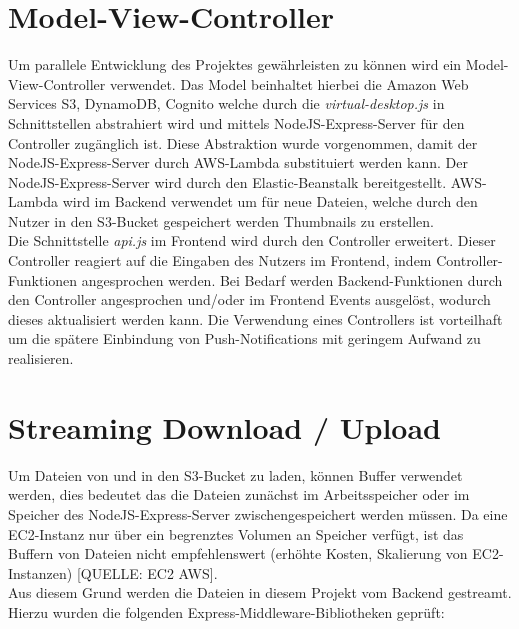 \documentclass[a4paper, 12pt]{scrreprt}
\begin{document}
\section{Model-View-Controller}

Um parallele Entwicklung des Projektes gewährleisten zu können wird ein Model-View-Controller verwendet. Das Model beinhaltet hierbei die Amazon Web Services S3, DynamoDB, Cognito welche durch die \textit{virtual-desktop.js} in Schnittstellen abstrahiert wird und mittels NodeJS-Express-Server für den Controller zugänglich ist. Diese Abstraktion wurde vorgenommen, damit der NodeJS-Express-Server durch AWS-Lambda substituiert werden kann. Der NodeJS-Express-Server wird durch den Elastic-Beanstalk bereitgestellt. AWS-Lambda wird im Backend verwendet um für neue Dateien, welche durch den Nutzer in den S3-Bucket gespeichert werden Thumbnails zu erstellen.\\
Die Schnittstelle \textit{api.js} im Frontend wird durch den Controller erweitert. Dieser Controller reagiert auf die Eingaben des Nutzers im Frontend, indem Controller-Funktionen angesprochen werden. Bei Bedarf werden Backend-Funktionen durch den Controller angesprochen und/oder im Frontend Events ausgelöst, wodurch dieses aktualisiert werden kann.
Die Verwendung eines Controllers ist vorteilhaft um die spätere Einbindung von Push-Notifications mit geringem Aufwand zu realisieren.



\section{Streaming Download / Upload}

Um Dateien von und in den S3-Bucket zu laden, können Buffer verwendet werden, dies bedeutet das die Dateien zunächst im Arbeitsspeicher oder im Speicher des NodeJS-Express-Server zwischengespeichert werden müssen. Da eine EC2-Instanz nur über ein begrenztes Volumen an Speicher verfügt, ist das Buffern von Dateien nicht empfehlenswert (erhöhte Kosten, Skalierung von EC2-Instanzen) [QUELLE: EC2 AWS].\\
Aus diesem Grund werden die Dateien in diesem Projekt vom Backend gestreamt. Hierzu wurden die folgenden Express-Middleware-Bibliotheken geprüft:
\end{document}
